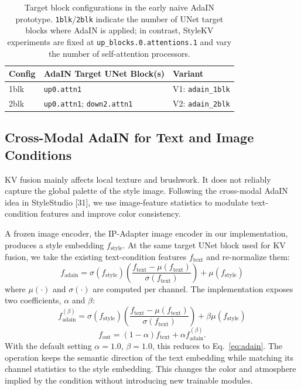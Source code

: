 \documentclass[10pt,twocolumn]{article}
\begin{document}
\begin{table}[htbp]
  \centering
  \caption{Target block configurations in the early naive AdaIN prototype. \texttt{1blk}/\texttt{2blk} indicate the number of UNet target blocks where AdaIN is applied; in contrast, StyleKV experiments are fixed at \texttt{up\_blocks.0.attentions.1} and vary the number of self-attention processors.}
  \label{tab:adain_target_blocks}
  \footnotesize
  \setlength{\tabcolsep}{3pt}
  \begin{tabular}{p{1.5cm}p{3.6cm}p{2.5cm}}
    \toprule
    Config & AdaIN Target UNet Block(s) & Variant \\
    \midrule
    1blk & \texttt{up0.attn1} & V1: \texttt{adain\_1blk} \\
    2blk & \texttt{up0.attn1}; \texttt{down2.attn1} & V2: \texttt{adain\_2blk} \\
    \bottomrule
  \end{tabular}
\end{table}

\subsection{Cross-Modal AdaIN for Text and Image Conditions}

KV fusion mainly affects local texture and brushwork. It does not reliably capture the global palette of the style image. Following the cross-modal AdaIN idea in StyleStudio [31], we use image-feature statistics to modulate text-condition features and improve color consistency.

A frozen image encoder, the IP-Adapter image encoder in our implementation, produces a style embedding $f_{\text{style}}$. At the same target UNet block used for KV fusion, we take the existing text-condition features $f_{\text{text}}$ and re-normalize them:
\begin{equation}
f_{\text{adain}} = \sigma(f_{\text{style}}) \left( \frac{f_{\text{text}} - \mu(f_{\text{text}})}{\sigma(f_{\text{text}})} \right) + \mu(f_{\text{style}}) \label{eq:adain}
\end{equation}
where $\mu(\cdot)$ and $\sigma(\cdot)$ are computed per channel. The implementation exposes two coefficients, $\alpha$ and $\beta$:
\begin{equation}
f_{\text{adain}}^{(\beta)} = \sigma(f_{\text{style}}) \left( \frac{f_{\text{text}} - \mu(f_{\text{text}})}{\sigma(f_{\text{text}})} \right) + \beta \mu(f_{\text{style}})
\end{equation}
\begin{equation}
f_{\text{out}} = (1-\alpha) f_{\text{text}} + \alpha f_{\text{adain}}^{(\beta)}.
\end{equation}
With the default setting $\alpha{=}1.0$, $\beta{=}1.0$, this reduces to Eq.~\ref{eq:adain}. The operation keeps the semantic direction of the text embedding while matching its channel statistics to the style embedding. This changes the color and atmosphere implied by the condition without introducing new trainable modules.
\end{document}
